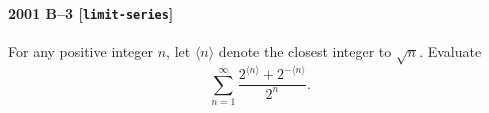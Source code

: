 \paragraph{2001 B--3 \textnormal{[\texttt{limit-series}]}}
For any positive integer $n$, let $\langle n\rangle$ denote
the closest integer to $\sqrt{n}$. Evaluate
\[\sum_{n=1}^\infty \frac{2^{\langle n\rangle}+2^{-\langle n\rangle}}
                         {2^n}.\]
